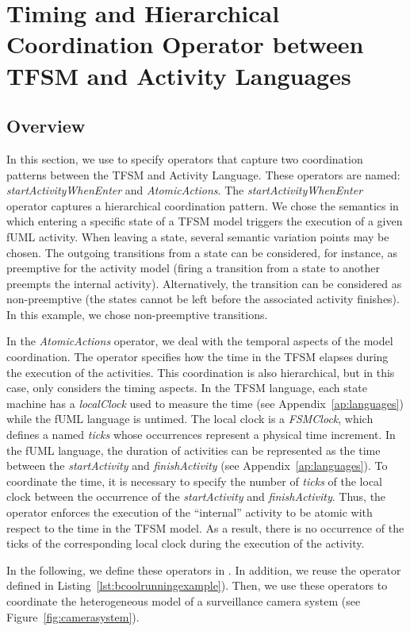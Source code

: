 \section{Timing and Hierarchical Coordination Operator between TFSM and Activity Languages}
\subsection{Overview}
In this section, we use \bcool to specify operators that capture two coordination patterns between the TFSM and Activity Language. These operators are named: \emph{startActivityWhenEnter} and \emph{AtomicActions}. The \emph{startActivityWhenEnter} operator captures a hierarchical coordination pattern. We chose the semantics in which entering a specific state of a TFSM model triggers the execution of a given fUML activity. When leaving a state, several semantic variation points may be chosen. The outgoing transitions from a state can be considered, for instance, as preemptive for the activity model (\ie firing a transition from a state to another preempts the internal activity). Alternatively, the transition can be considered as non-preemptive (\ie the states cannot be left before the associated activity finishes). In this example, we chose non-preemptive transitions.

In the \emph{AtomicActions} operator, we deal with the temporal aspects of the model coordination. The operator specifies how the time in the TFSM elapses during the execution of the activities. This coordination is also hierarchical, but in this case, only considers the timing aspects. In the TFSM language, each state machine has a \emph{localClock} used to measure the time (see Appendix~\ref{ap:languages}) while the fUML language is untimed. The local clock is a \emph{FSMClock}, which defines a \dse named \emph{ticks} whose occurrences represent a physical time increment. In the fUML language, the duration of activities can be represented as the time between the \dse \emph{startActivity} and \dse \emph{finishActivity} (see Appendix~\ref{ap:languages}). To coordinate the time, it is necessary to specify the number of \emph{ticks} of the local clock between the occurrence of the \dse \emph{startActivity} and \emph{finishActivity}. Thus, the operator enforces the execution of the ``internal'' activity to be atomic with respect to the time in the TFSM model. As a result, there is no occurrence of the \dse ticks of the corresponding local clock during the execution of the activity.

In the following, we define these operators in \bcool. In addition, we reuse the operator defined in Listing~\ref{lst:bcoolrunningexample}). Then, we use these operators to coordinate the heterogeneous model of a surveillance camera system (see Figure~\ref{fig:camerasystem}).

